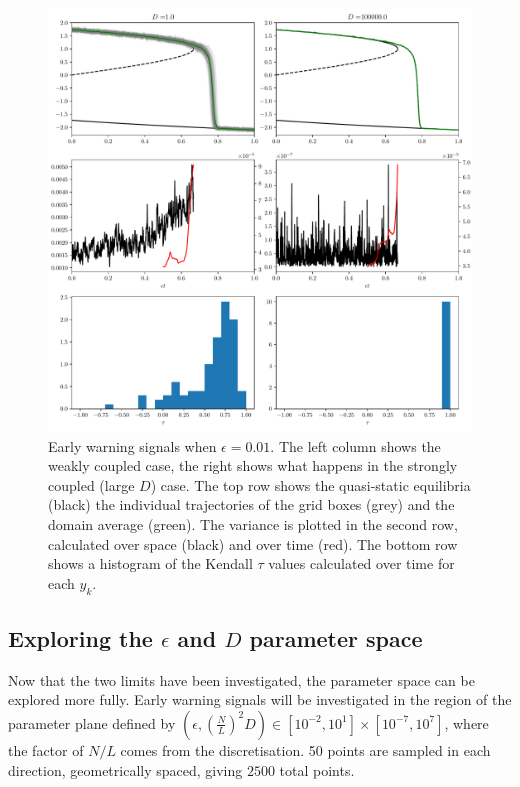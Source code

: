 \begin{figure}
  \centering
  \includegraphics[width=\textwidth,keepaspectratio]{coupled_variance}
  \caption[Early Warning Signals in the slowly forced limit]{Early warning signals when $\epsilon = 0.01$. The left column shows 
    the weakly coupled case, the right shows what happens in the strongly coupled (large $D$) case. 
    The top row shows the quasi-static equilibria (black) the individual
    trajectories of the grid boxes (grey) and the domain average (green).
    The variance is plotted in the second row, calculated over space 
    (black) and over time (red). The bottom row shows a histogram of the Kendall $\tau$ values calculated over time for each $y_k$.}
  \label{fig:coupled_timeseries}
\end{figure}

\subsection{Exploring the $\epsilon$ and $D$ parameter space}
Now that the two limits have been investigated, the parameter space can be explored more fully.
Early warning signals will be investigated in the region of the parameter plane defined by $(\epsilon,\left(\frac{N}{L}\right)^2 D) \in [10^{-2},10^1] \times [10^{-7}, 10^{7}]$,
where the factor of $N/L$ comes from the discretisation.
50 points are sampled in each direction, geometrically spaced, giving $2500$ total points.

